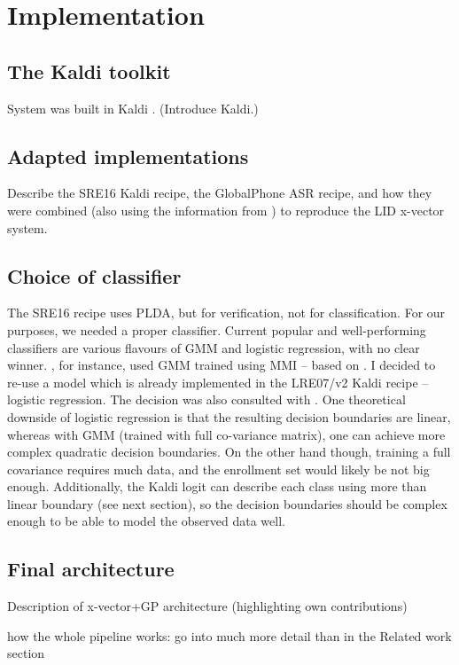 \documentclass[bsc,frontabs,twoside,singlespacing,parskip,deptreport]{infthesis}
\begin{document}
\chapter{Implementation}{
  \section{The Kaldi toolkit}{
    System was built in Kaldi \citep{Povey_et_al_2011}. (Introduce Kaldi.)
  }
  \section{Adapted implementations}{
    Describe the SRE16 Kaldi recipe, the GlobalPhone ASR recipe, and how they were combined (also using the information from \cite{Snyder_et_al_2018}) to reproduce the LID x-vector system.
  }

  \section{Choice of classifier}{
    The SRE16 recipe uses PLDA, but for verification, not for classification. For our purposes, we needed a proper classifier. Current popular and well-performing classifiers are various flavours of GMM and logistic regression, with no clear winner. \cite{Snyder_et_al_2018}, for instance, used GMM trained using MMI -- based on \cite{McCree_2014}. I decided to re-use a model which is already implemented in the LRE07/v2 Kaldi recipe -- logistic regression. The decision was also consulted with \cite{Snyder_2018_kaldi-help}. One theoretical downside of logistic regression is that the resulting decision boundaries are linear, whereas with GMM (trained with full co-variance matrix), one can achieve more complex quadratic decision boundaries. On the other hand though, training a full covariance requires much data, and the enrollment set would likely be not big enough. Additionally, the Kaldi logit can describe each class using more than linear boundary (see next section), so the decision boundaries should be complex enough to be able to model the observed data well.
  }

  \section{Final architecture}{
    Description of x-vector+GP architecture (highlighting own contributions)

    how the whole pipeline works: go into much more detail than in the Related work section

}}
\end{document}
